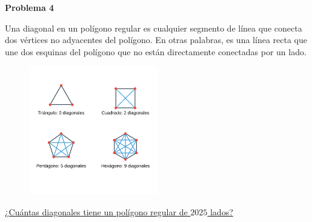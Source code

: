\begin{center}
\Large \textbf{Problema 4}
\end{center}

Una diagonal en un polígono regular es cualquier segmento de línea que conecta dos vértices no adyacentes del polígono.
En otras palabras, es una línea recta que une dos esquinas del polígono que no están directamente conectadas por un lado.

\begin{figure}[H]
    \centering
    \includegraphics[width=0.5\textwidth]{diagonales.png}
\end{figure}

\underline{¿Cuántas diagonales tiene un polígono regular de $2025$ lados?}

